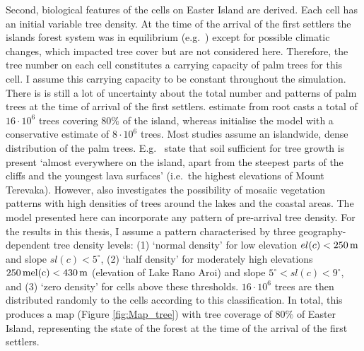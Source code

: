 Second, biological features of the cells on Easter Island are derived. 
Each cell has an initial variable tree density. 
At the time of the arrival of the first settlers the islands forest system was in equilibrium (e.g.\ \citet{Brander1998}) except for possible climatic changes, which impacted tree cover \citep{Rull2020} but are not considered here. 
Therefore, the tree number on each cell constitutes a carrying capacity of palm trees for this cell. I assume this carrying capacity to be constant throughout the simulation.
There is is still a lot of uncertainty about the total number and patterns of palm trees at the time of arrival of the first settlers. 
\citet{MiethBork2015} estimate from root casts a total of $16\cdot10^6$ trees covering $80\%$ of the island, whereas \citet{Brandt2015} initialise the model with a conservative estimate of $8\cdot 10^6$ trees. 
Most studies assume an islandwide, dense distribution of the palm trees. 
E.g.\ \citet{Bahn2017} state that soil sufficient for tree growth is present `almost everywhere on the island, apart from the steepest parts of the cliffs and the youngest lava surfaces' (i.e.\ the highest elevations of Mount Terevaka). 
However, \citet{Rull2020} also investigates the possibility of mosaiic vegetation patterns with high densities of trees around the lakes and the coastal areas.
The model presented here can incorporate any pattern of pre-arrival tree density. 
For the results in this thesis, I assume a pattern characterised by three geography-dependent tree density levels: (1) `normal density' for low elevation $el(c)<250\, \rm{m}$ and slope $sl(c)<5^\circ$, (2) `half density' for moderately high elevations $250\, \rm{m}el(c)<430\, \rm{m}$ (elevation of Lake Rano Aroi) and slope $5^\circ < sl(c) < 9^\circ$, and (3) `zero density' for cells above these thresholds.
$16\cdot 10^6$ trees are then distributed randomly to the cells according to this classification. 
In total, this produces a map (Figure \ref{fig:Map_tree}) with tree coverage of $80\%$ of Easter Island, representing the state of the forest at the time of the arrival of the first settlers.


